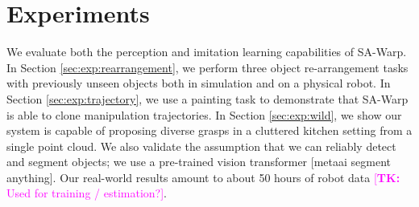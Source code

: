 \documentclass{article}
\newcommand{\rob}[1]{\textcolor{green}{[\textbf{rob:} #1]}}
\newcommand{\tk}[1]{\textcolor{magenta}{[\textbf{TK:} #1]}}
\begin{document}



\section{Experiments}
\label{sec:exp}

We evaluate both the perception and imitation learning capabilities of SA-Warp. In Section \ref{sec:exp:rearrangement}, we perform three object re-arrangement tasks with previously unseen objects both in simulation and on a physical robot. In Section \ref{sec:exp:trajectory}, we use a painting task to demonstrate that SA-Warp is able to clone manipulation trajectories. In Section \ref{sec:exp:wild}, we show our system is capable of proposing diverse grasps in a cluttered kitchen setting from a single point cloud. We also validate the assumption that we can reliably detect and segment objects; we use a pre-trained vision transformer [metaai segment anything]. Our real-world results amount to about 50 hours of robot data \tk{Used for training / estimation?}.
\end{document}
